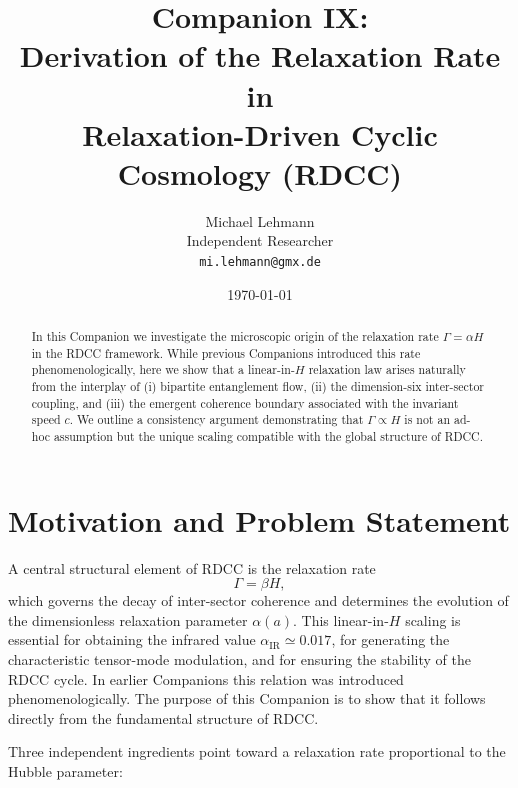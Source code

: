 \documentclass[11pt,a4paper]{article}
\title{Companion IX:\\Derivation of the Relaxation Rate in\\Relaxation-Driven Cyclic Cosmology (RDCC)}
\author{Michael Lehmann\\
Independent Researcher\\
\texttt{mi.lehmann@gmx.de}}
\date{\today}
\begin{document}
\maketitle

\begin{abstract}
In this Companion we investigate the microscopic origin of the relaxation rate 
$\Gamma = \alpha H$ in the RDCC framework. 
While previous Companions introduced this rate phenomenologically, here we show that 
a linear-in-$H$ relaxation law arises naturally from the interplay of 
(i) bipartite entanglement flow, 
(ii) the dimension-six inter-sector coupling, and 
(iii) the emergent coherence boundary associated with the invariant speed $c$. 
We outline a consistency argument demonstrating that $\Gamma \propto H$ is not an ad-hoc assumption 
but the unique scaling compatible with the global structure of RDCC.
\end{abstract}

\section{Motivation and Problem Statement}

A central structural element of RDCC is the relaxation rate
\begin{equation}
    \Gamma = \beta H,
\end{equation}
which governs the decay of inter-sector coherence and determines the evolution of the
dimensionless relaxation parameter $\alpha(a)$. This linear-in-$H$ scaling is essential for
obtaining the infrared value $\alpha_{\mathrm{IR}} \simeq 0.017$, for generating the characteristic
tensor-mode modulation, and for ensuring the stability of the RDCC cycle. In earlier
Companions this relation was introduced phenomenologically. The purpose of this
Companion is to show that it follows directly from the fundamental structure of RDCC.

Three independent ingredients point toward a relaxation rate proportional to the
Hubble parameter:
\end{document}
